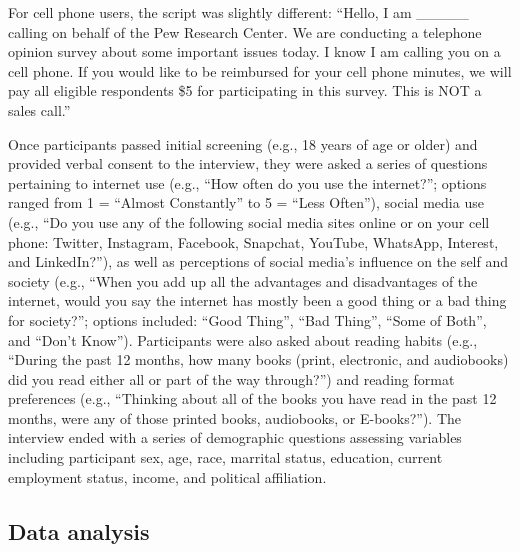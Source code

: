 \documentclass[man, fleqn, noextraspace]{apa6}
\theoremstyle{definition}
\theoremstyle{definition}
\theoremstyle{definition}
\theoremstyle{remark}
\begin{document}
For cell phone users, the script was slightly different: \enquote{Hello,
I am \_\_\_\_\_ calling on behalf of the Pew Research Center. We are
conducting a telephone opinion survey about some important issues today.
I know I am calling you on a cell phone. If you would like to be
reimbursed for your cell phone minutes, we will pay all eligible
respondents \$5 for participating in this survey. This is NOT a sales
call.}

Once participants passed initial screening (e.g., 18 years of age or
older) and provided verbal consent to the interview, they were asked a
series of questions pertaining to internet use (e.g., \enquote{How often
do you use the internet?}; options ranged from 1 = \enquote{Almost
Constantly} to 5 = \enquote{Less Often}), social media use (e.g.,
\enquote{Do you use any of the following social media sites online or on
your cell phone: Twitter, Instagram, Facebook, Snapchat, YouTube,
WhatsApp, Interest, and LinkedIn?}), as well as perceptions of social
media's influence on the self and society (e.g., \enquote{When you add
up all the advantages and disadvantages of the internet, would you say
the internet has mostly been a good thing or a bad thing for society?};
options included: \enquote{Good Thing}, \enquote{Bad Thing},
\enquote{Some of Both}, and \enquote{Don't Know}). Participants were
also asked about reading habits (e.g., \enquote{During the past 12
months, how many books (print, electronic, and audiobooks) did you read
either all or part of the way through?}) and reading format preferences
(e.g., \enquote{Thinking about all of the books you have read in the
past 12 months, were any of those printed books, audiobooks, or
E-books?}). The interview ended with a series of demographic questions
assessing variables including participant sex, age, race, marrital
status, education, current employment status, income, and political
affiliation.

\subsection{Data analysis}\label{data-analysis}
\end{document}
